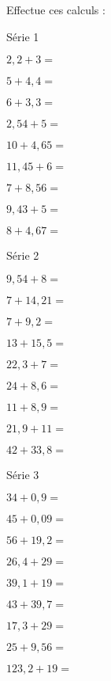 \begin{myenumerate}
\item Effectue ces calculs :
\begin{multicols}{3}
\begin{center}
Série 1
\end{center}
\begin{Myenumerate}
\item$2,2+3=$\dotfill
\item$5+4,4=$\dotfill
\item$6+3,3=$\dotfill
\item$2,54+5=$\dotfill
\item$10+4,65=$\dotfill
\item$11,45+6=$\dotfill
\item$7+8,56=$\dotfill
\item$9,43+5=$\dotfill
\item$8+4,67=$\dotfill
\end{Myenumerate}
\par
\begin{center}
Série 2
\end{center}
\begin{Myenumerate}
\item$9,54+8=$\dotfill
\item$7+14,21=$\dotfill
\item$7+9,2=$\dotfill
\item$13+15,5=$\dotfill
\item$22,3+7=$\dotfill
\item$24+8,6=$\dotfill
\item$11+8,9=$\dotfill
\item$21,9+11=$\dotfill
\item$42+33,8=$\dotfill
\end{Myenumerate}
\par
\begin{center}
Série 3
\end{center}
\begin{Myenumerate}
\item$34+0,9=$\dotfill
\item$45+0,09=$\dotfill
\item$56+19,2=$\dotfill
\item$26,4+29=$\dotfill
\item$39,1+19=$\dotfill
\item$43+39,7=$\dotfill
\item$17,3+29=$\dotfill
\item$25+9,56=$\dotfill
\item$123,2+19=$\dotfill

\end{Myenumerate}
\end{multicols}
\end{myenumerate}
